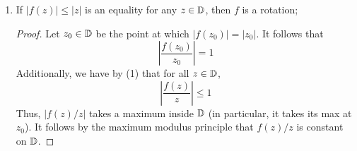 \documentclass[../notes.tex]{subfiles}
\begin{document}
\begin{itemize}
\begin{enumerate}
\begin{proof}
            so
            \begin{equation*}
                \frac{f(z)}{z} = a_1+a_2z+\cdots
            \end{equation*}
            This means that $f(z)/z$ has a removable singularity which we can fill in via Riemann's removable singularity theorem to get
            \begin{equation*}
                \frac{f(0)}{0} = f'(0)
            \end{equation*}
            Now pick an $r\in(0,1)$ and let $z\in\partial D_r(0)$ be arbitrary. Then
            \begin{equation*}
                \left| \frac{f(z)}{z} \right| = \frac{|f(z)|}{|z|}
                = \frac{|f(z)|}{r}
                \leq \frac{1}{r}
            \end{equation*}
            Essentially, we have bounded the value of $f(z)/z$ on the boundary of a disk. Moreover, it follows by the maximum modulus principle that this bound must hold for all $z\in D_r(0)$. (Otherwise, we would get a local maximum inside $D_r(0)$; this would imply by the MMP that $f$ is constant, which we can't have because the function is conformal [hence nonconstant] by hypothesis.) Thus, we have shown that
            \begin{equation*}
                |f(z)| \leq \frac{1}{r}\cdot|z|
            \end{equation*}
            for all $z\in D_r(0)$. To finish it off, we can send $r\to 1$, thereby including all $z\in\D$ in our argument and transforming the above inequality into the desired one.
        \end{proof}
        \item If $|f(z)|\leq|z|$ is an equality for any $z\in\D$, then $f$ is a rotation;
        \begin{proof}
            Let $z_0\in\mathbb{D}$ be the point at which $|f(z_0)|=|z_0|$. It follows that
            \begin{equation*}
                \left| \frac{f(z_0)}{z_0} \right| = 1
            \end{equation*}
            Additionally, we have by (1) that for all $z\in\D$,
            \begin{equation*}
                \left| \frac{f(z)}{z} \right| \leq 1
            \end{equation*}
            Thus, $|f(z)/z|$ takes a maximum inside $\mathbb{D}$ (in particular, it takes its max at $z_0$). It follows by the maximum modulus principle that $f(z)/z$ is constant on $\mathbb{D}$.\par

\end{proof}
\end{enumerate}
\end{itemize}
\end{document}
